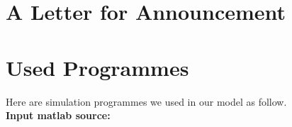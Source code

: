 \newpage
\begin{appendices}
\section{A Letter for Announcement}

\section{Used Programmes}
Here are simulation programmes we used in our model as follow.\\

\textbf{\textcolor[rgb]{0.98,0.00,0.00}{Input matlab source:}}




%

\end{appendices}